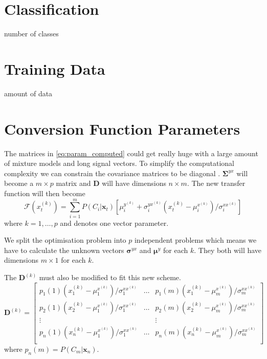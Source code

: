 
\section{Classification} %
\label{sec:classification}
number of classes

\section{Training Data} %
\label{sec:training_data}
amount of data

\section{Conversion Function Parameters} %
\label{sec:conversion_function_parameters}
The matrices in \eqref{eq:param_computed} could get really huge with a large amount of mixture models and long signal vectors. To simplify the computational complexity we can constrain the covariance matrices to be diagonal \cite{stylianou98}. $\mathbf{\Sigma}^{yx}$ will become a $m\times p$ matrix and $\mathbf{D}$ will have dimensions $n\times m$. The new transfer function will then become
\begin{equation}
	\mathcal{F}(x_t^{(k)}) = \sum_{i=1}^{m}P(C_i \vert \mathbf{x}_t)[\mu_i^{y^{(k)}}+\sigma_i^{yx^{(k)}}  (x_t^{(k)}-\mu_i^{x^{(k)}})/\sigma_i^{xx^{(k)}}]
\end{equation}
where $k=1,\dots,p$ and denotes one vector parameter.

We split the optimisation problem into $p$ independent problems which means we have to calculate the unknown vectors $\boldsymbol{\sigma}^{yx}$ and $\boldsymbol{\mu}^{y}$ for each $k$. They both will have dimensions $m\times 1$ for each $k$.

The $\mathbf{D}^{(k)}$ must also be modified to fit this new scheme.
\begin{equation}
	\label{eq:D_matrix_new}
	\mathbf{D}^{(k)} = \begin{bmatrix}
		p_1(1)(x_1^{(k)} - \mu_1^{x^{(k)}})/\sigma_1^{xx^{(k)}} & \dots & p_1(m)(x_1^{(k)} - \mu_m^{x^{(k)}})/\sigma_m^{xx^{(k)}} \\
		p_2(1)(x_2^{(k)} - \mu_1^{x^{(k)}})/\sigma_1^{xx^{(k)}} & \dots & p_2(m)(x_2^{(k)} - \mu_m^{x^{(k)}})/\sigma_m^{xx^{(k)}} \\
		\vdots & & \vdots \\
		p_n(1)(x_n^{(k)} - \mu_1^{x^{(k)}})/\sigma_1^{xx^{(k)}} & \dots & p_n(m)(x_n^{(k)} - \mu_m^{x^{(k)}})/\sigma_m^{xx^{(k)}} \\
	\end{bmatrix}
\end{equation}
where $p_n(m)=P(C_m\vert \mathbf{x}_n)$.

